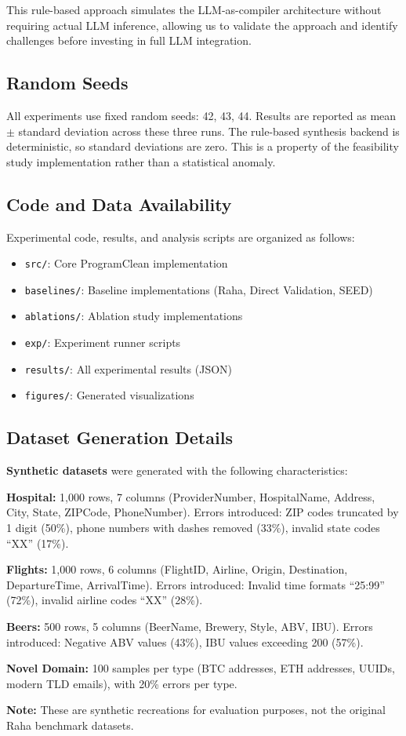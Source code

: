 \documentclass{article}
\begin{document}
This rule-based approach simulates the LLM-as-compiler architecture without requiring actual LLM inference, allowing us to validate the approach and identify challenges before investing in full LLM integration.

\subsection{Random Seeds}

All experiments use fixed random seeds: 42, 43, 44. Results are reported as mean $\pm$ standard deviation across these three runs. The rule-based synthesis backend is deterministic, so standard deviations are zero. This is a property of the feasibility study implementation rather than a statistical anomaly.

\subsection{Code and Data Availability}

Experimental code, results, and analysis scripts are organized as follows:
\begin{itemize}
    \item \texttt{src/}: Core ProgramClean implementation
    \item \texttt{baselines/}: Baseline implementations (Raha, Direct Validation, SEED)
    \item \texttt{ablations/}: Ablation study implementations
    \item \texttt{exp/}: Experiment runner scripts
    \item \texttt{results/}: All experimental results (JSON)
    \item \texttt{figures/}: Generated visualizations
\end{itemize}

\subsection{Dataset Generation Details}

\textbf{Synthetic datasets} were generated with the following characteristics:

\textbf{Hospital:} 1,000 rows, 7 columns (ProviderNumber, HospitalName, Address, City, State, ZIPCode, PhoneNumber). Errors introduced: ZIP codes truncated by 1 digit (50\%), phone numbers with dashes removed (33\%), invalid state codes ``XX'' (17\%).

\textbf{Flights:} 1,000 rows, 6 columns (FlightID, Airline, Origin, Destination, DepartureTime, ArrivalTime). Errors introduced: Invalid time formats ``25:99'' (72\%), invalid airline codes ``XX'' (28\%).

\textbf{Beers:} 500 rows, 5 columns (BeerName, Brewery, Style, ABV, IBU). Errors introduced: Negative ABV values (43\%), IBU values exceeding 200 (57\%).

\textbf{Novel Domain:} 100 samples per type (BTC addresses, ETH addresses, UUIDs, modern TLD emails), with 20\% errors per type.

\textbf{Note:} These are synthetic recreations for evaluation purposes, not the original Raha benchmark datasets.
\end{document}
